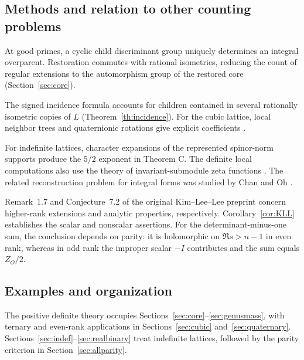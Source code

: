 \documentclass[11pt]{article}
\theoremstyle{remark}\newtheorem{remark}[theorem]{Remark}
\begin{document}
\subsection{Methods and relation to other counting problems}

At good primes, a cyclic child discriminant group uniquely determines
an integral overparent. Restoration commutes with rational isometries,
reducing the count of regular extensions to the automorphism group of
the restored core (Section~\ref{sec:core}).

The signed incidence formula accounts for children contained in
several rationally isometric copies of $L$
(Theorem~\ref{th:incidence}). For the cubic lattice, local neighbor
trees and quaternionic rotations give explicit coefficients
\cite{Baake,BaakeZeiner,Chenevier,Zeiner,Voight}.

For indefinite lattices, character expansions of the represented
spinor-norm supports produce the $5/2$ exponent in Theorem C. The
definite local computations also use the theory of invariant-submodule
zeta functions \cite{Solomon,Rossmann}. The related reconstruction
problem for integral forms was studied by Chan and Oh \cite{ChanOh}.

Remark~1.7 and Conjecture~7.2 of the original Kim--Lee--Lee
preprint \cite{KLLpre} concern higher-rank extensions and analytic
properties, respectively. Corollary~\ref{cor:KLL} establishes the
scalar and nonscalar assertions. For the determinant-minus-one sum,
the conclusion depends on parity: it is holomorphic on $\Re s>n-1$
in even rank, whereas in odd rank the improper scalar $-I$ contributes
and the sum equals $Z_O/2$.

\subsection{Examples and organization}

The positive definite theory occupies Sections~\ref{sec:core}--\ref{sec:genusmass},
with ternary and even-rank applications in Sections~\ref{sec:cubic}
and~\ref{sec:quaternary}. Sections~\ref{sec:indef}--\ref{sec:realbinary}
treat indefinite lattices, followed by the parity criterion in
Section~\ref{sec:allparity}.
\end{document}
